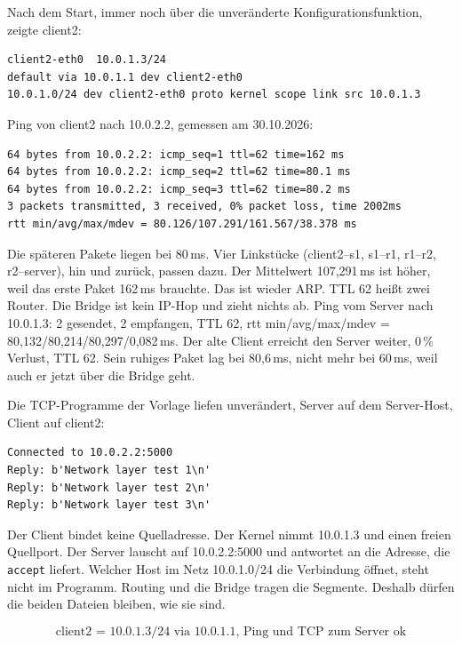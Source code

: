 \documentclass[a4paper,11pt]{article}
\newif\ifexplain
\newcommand{\explain}[1]{\ifexplain\begin{erklbox}#1\end{erklbox}\fi}
\begin{document}
Nach dem Start, immer noch über die unveränderte Konfigurationsfunktion, zeigte client2:
\begin{lstlisting}
client2-eth0  10.0.1.3/24
default via 10.0.1.1 dev client2-eth0
10.0.1.0/24 dev client2-eth0 proto kernel scope link src 10.0.1.3
\end{lstlisting}
Ping von client2 nach 10.0.2.2, gemessen am 30.10.2026:
\begin{lstlisting}
64 bytes from 10.0.2.2: icmp_seq=1 ttl=62 time=162 ms
64 bytes from 10.0.2.2: icmp_seq=2 ttl=62 time=80.1 ms
64 bytes from 10.0.2.2: icmp_seq=3 ttl=62 time=80.2 ms
3 packets transmitted, 3 received, 0% packet loss, time 2002ms
rtt min/avg/max/mdev = 80.126/107.291/161.567/38.378 ms
\end{lstlisting}
Die späteren Pakete liegen bei 80\,ms. Vier Linkstücke (client2--s1, s1--r1, r1--r2, r2--server), hin und zurück, passen dazu. Der Mittelwert 107,291\,ms ist höher, weil das erste Paket 162\,ms brauchte. Das ist wieder ARP. TTL 62 heißt zwei Router. Die Bridge ist kein IP-Hop und zieht nichts ab. Ping vom Server nach 10.0.1.3: 2 gesendet, 2 empfangen, TTL 62, rtt min/avg/max/mdev = 80,132/80,214/80,297/0,082\,ms. Der alte Client erreicht den Server weiter, 0\,\% Verlust, TTL 62. Sein ruhiges Paket lag bei 80,6\,ms, nicht mehr bei 60\,ms, weil auch er jetzt über die Bridge geht.

Die TCP-Programme der Vorlage liefen unverändert, Server auf dem Server-Host, Client auf client2:
\begin{lstlisting}
Connected to 10.0.2.2:5000
Reply: b'Network layer test 1\n'
Reply: b'Network layer test 2\n'
Reply: b'Network layer test 3\n'
\end{lstlisting}
Der Client bindet keine Quelladresse. Der Kernel nimmt 10.0.1.3 und einen freien Quellport. Der Server lauscht auf 10.0.2.2:5000 und antwortet an die Adresse, die \texttt{accept} liefert. Welcher Host im Netz 10.0.1.0/24 die Verbindung öffnet, steht nicht im Programm. Routing und die Bridge tragen die Segmente. Deshalb dürfen die beiden Dateien bleiben, wie sie sind.

\explain{Eine neue Adresse im Servernetz, etwa 10.0.2.3, wäre die falsche Seite: die Skizze hängt den neuen Client links an r1. 10.0.1.3 ist frei und liegt im selben Netz wie das Gateway 10.0.1.1. Ohne die Default-Route würde client2 10.0.2.2 nicht kennen, das verbundene Netz ist nur 10.0.1.0/24. Die Bridge ist der Punkt, an dem man sich leicht vertut: zwei Interfaces von r1 im selben /24 sind kein Ersatz für eine gemeinsame Schicht-2-Verbindung.}
\[\boxed{\text{client2 = 10.0.1.3/24 via 10.0.1.1, Ping und TCP zum Server ok}}\]
\end{document}
